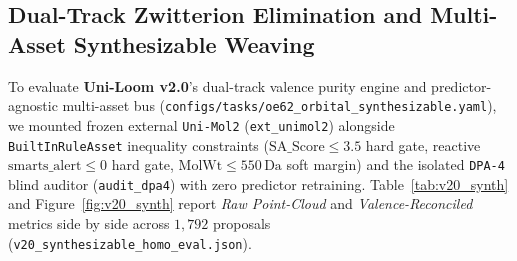 \documentclass[11pt,a4paper]{article}
\begin{document}
\subsection{Dual-Track Zwitterion Elimination and Multi-Asset Synthesizable Weaving}
\label{sec:exp_v20_synth}

To evaluate \textbf{Uni-Loom v2.0}'s dual-track valence purity engine and predictor-agnostic multi-asset bus (\texttt{configs/tasks/oe62\_orbital\_synthesizable.yaml}), we mounted frozen external \texttt{Uni-Mol2} (\texttt{ext\_unimol2}) alongside \texttt{BuiltInRuleAsset} inequality constraints ($\text{SA\_Score} \le 3.5$ hard gate, reactive $\text{smarts\_alert} \le 0$ hard gate, $\text{MolWt} \le 550\,\text{Da}$ soft margin) and the isolated \texttt{DPA-4} blind auditor (\texttt{audit\_dpa4}) with zero predictor retraining. Table~\ref{tab:v20_synth} and Figure~\ref{fig:v20_synth} report \emph{Raw Point-Cloud} and \emph{Valence-Reconciled} metrics side by side across $1{,}792$ proposals (\texttt{v20\_synthesizable\_homo\_eval.json}).

\begin{table}[!t]
\centering
\caption{Side-by-side \emph{Raw Point-Cloud} vs.\ \emph{Valence-Reconciled} ($\text{RMSD}_{\text{heavy}} = 0.0000\,\text{\AA}$) comparison of dual-track zwitterion elimination and zero-retrain synthesizable weaving ($\text{SA\_Score} \le 3.5$ \& $\text{SMARTS} = 0$) across $1{,}792$ \texttt{OE62 HOMO} proposals.}
\label{tab:v20_synth}
\end{table}
\end{document}
